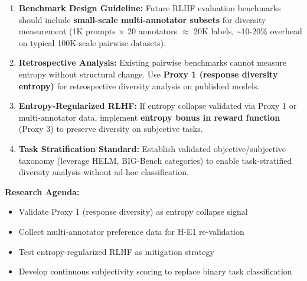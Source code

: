 \begin{enumerate}
\item \textbf{Benchmark Design Guideline:} Future RLHF evaluation benchmarks should include \textbf{small-scale multi-annotator subsets} for diversity measurement (1K prompts $\times$ 20 annotators $\approx$ 20K labels, \textasciitilde{}10-20\% overhead on typical 100K-scale pairwise datasets).

\item \textbf{Retrospective Analysis:} Existing pairwise benchmarks cannot measure entropy without structural change. Use \textbf{Proxy 1 (response diversity entropy)} for retrospective diversity analysis on published models.

\item \textbf{Entropy-Regularized RLHF:} If entropy collapse validated via Proxy 1 or multi-annotator data, implement \textbf{entropy bonus in reward function} (Proxy 3) to preserve diversity on subjective tasks.

\item \textbf{Task Stratification Standard:} Establish validated objective/subjective taxonomy (leverage HELM, BIG-Bench categories) to enable task-stratified diversity analysis without ad-hoc classification.
\end{enumerate}

\textbf{Research Agenda:}
\begin{itemize}
\item Validate Proxy 1 (response diversity) as entropy collapse signal
\item Collect multi-annotator preference data for H-E1 re-validation
\item Test entropy-regularized RLHF as mitigation strategy
\item Develop continuous subjectivity scoring to replace binary task classification
\end{itemize}
